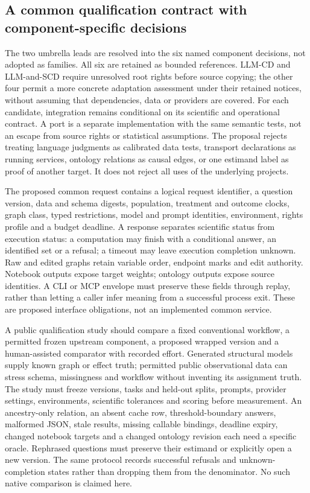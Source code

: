 \subsection{A common qualification contract with component-specific decisions}
The two umbrella leads are resolved into the six named component decisions,
not adopted as families. All six are retained as bounded references. LLM-CD
and LLM-and-SCD require unresolved root rights before source copying; the
other four permit a more concrete adaptation assessment under their retained
notices, without assuming that dependencies, data or providers are covered.
For each candidate, integration remains conditional on its scientific and
operational contract. A port is a separate implementation with the same
semantic tests, not an escape from source rights or statistical assumptions.
The proposal rejects treating language judgments as calibrated data tests,
transport declarations as running services, ontology relations as causal
edges, or one estimand label as proof of another target. It does not reject
all uses of the underlying projects.~\citep{exec25_agents_choice}

The proposed common request contains a logical request identifier, a question
version, data and schema digests, population, treatment and outcome clocks,
graph class, typed restrictions, model and prompt identities, environment,
rights profile and a budget deadline. A response separates scientific status
from execution status: a computation may finish with a conditional answer,
an identified set or a refusal; a timeout may leave execution completion
unknown. Raw and edited graphs retain variable order, endpoint marks and edit
authority. Notebook outputs expose target weights; ontology outputs expose
source identities. A CLI or MCP envelope must preserve these fields through
replay, rather than letting a caller infer meaning from a successful process
exit. These are proposed interface obligations, not an implemented common
service.~\citep{exec25_agents_choice}

A public qualification study should compare a fixed conventional workflow,
a permitted frozen upstream component, a proposed wrapped version and a
human-assisted comparator with recorded effort. Generated structural models
supply known graph or effect truth; permitted public observational data can
stress schema, missingness and workflow without inventing its assignment
truth. The study must freeze versions, tasks and held-out splits, prompts,
provider settings, environments, scientific tolerances and scoring before
measurement. An ancestry-only relation, an absent cache row, threshold-boundary
answers, malformed JSON, stale results, missing callable bindings, deadline
expiry, changed notebook targets and a changed ontology revision each need a
specific oracle. Rephrased questions must preserve their estimand or explicitly
open a new version. The same protocol records successful refusals and
unknown-completion states rather than dropping them from the denominator.
No such native comparison is claimed here.~\citep{exec25_agents_choice}


